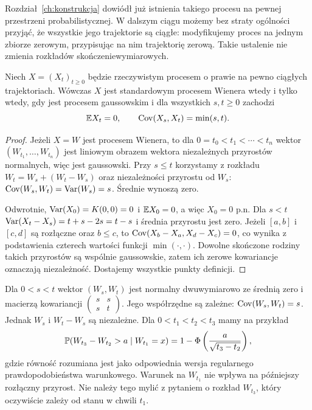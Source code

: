 Rozdział~\ref{ch:konstrukcja} dowiódł już istnienia takiego
procesu na pewnej przestrzeni probabilistycznej.
W dalszym ciągu możemy bez straty ogólności przyjąć,
że wszystkie jego trajektorie są ciągłe: modyfikujemy proces
na jednym zbiorze zerowym, przypisując na nim trajektorię zerową.
Takie ustalenie nie zmienia rozkładów skończeniewymiarowych.

\begin{twierdzenie}
Niech $X=(X_t)_{t\ge0}$ będzie rzeczywistym procesem
o prawie na pewno ciągłych trajektoriach. Wówczas $X$
jest standardowym procesem Wienera wtedy i tylko wtedy,
gdy jest procesem gaussowskim i dla wszystkich $s,t\ge0$
zachodzi
\[
\mathbb{E} X_t=0,\qquad \operatorname{Cov}(X_s,X_t)=\min(s,t).
\]
\end{twierdzenie}
\begin{proof}
Jeżeli $X=W$ jest procesem Wienera, to dla
$0=t_0<t_1<\cdots<t_n$ wektor $(W_{t_1},\ldots,W_{t_n})$
jest liniowym obrazem wektora niezależnych przyrostów normalnych,
więc jest gaussowski. Przy $s\le t$ korzystamy z rozkładu
$W_t=W_s+(W_t-W_s)$ oraz niezależności przyrostu od $W_s$:
$\operatorname{Cov}(W_s,W_t)=\operatorname{Var}(W_s)=s$. Średnie wynoszą zero.

Odwrotnie, $\operatorname{Var}(X_0)=K(0,0)=0$ i $\mathbb{E} X_0=0$,
a więc $X_0=0$ p.n. Dla $s<t$
$\operatorname{Var}(X_t-X_s)=t+s-2s=t-s$ i średnia przyrostu
jest zero. Jeżeli $[a,b]$ i $[c,d]$ są rozłączne oraz $b\le c$,
to $\operatorname{Cov}(X_b-X_a,X_d-X_c)=0$, co wynika z podstawienia
czterech wartości funkcji $\min(\cdot,\cdot)$.
Dowolne skończone rodziny takich przyrostów są wspólnie
gaussowskie, zatem ich zerowe kowariancje oznaczają niezależność.
Dostajemy wszystkie punkty definicji.
\end{proof}

\begin{przyklad}
Dla $0<s<t$ wektor $(W_s,W_t)$ jest normalny dwuwymiarowo
ze średnią zero i macierzą kowariancji
$\left(\begin{smallmatrix}s&s\\s&t\end{smallmatrix}\right)$.
Jego współrzędne są zależne: $\operatorname{Cov}(W_s,W_t)=s$.
Jednak $W_s$ i $W_t-W_s$ są niezależne.
Dla $0<t_1<t_2<t_3$ mamy na przykład
\[
\mathbb{P}(W_{t_3}-W_{t_2}>a\mid W_{t_1}=x)
=1-\Phi\left(\frac{a}{\sqrt{t_3-t_2}}\right),
\]
gdzie równość rozumiana jest jako odpowiednia wersja
regularnego prawdopodobieństwa warunkowego.
Warunek na $W_{t_1}$ nie wpływa na późniejszy rozłączny przyrost.
Nie należy tego mylić z pytaniem o rozkład $W_{t_3}$,
który oczywiście zależy od stanu w chwili $t_1$.
\end{przyklad}

